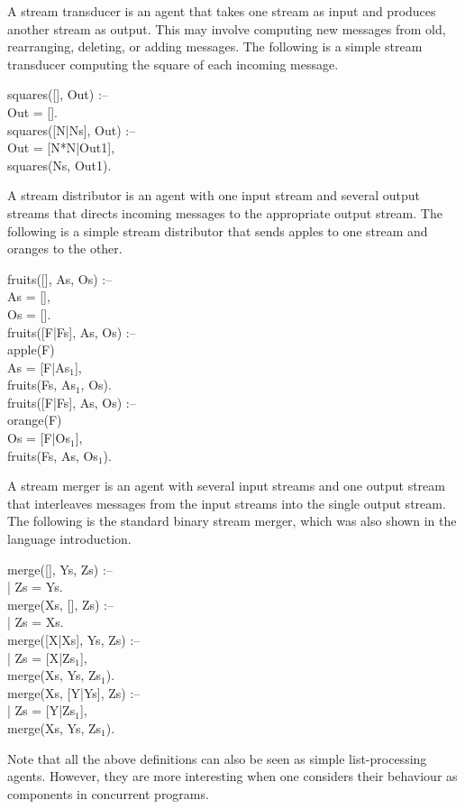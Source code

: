 A stream transducer is an agent that takes one stream as input and
produces another stream as output.  This may involve computing new
messages from old, rearranging, deleting, or adding messages.  The
following is a simple stream transducer computing the square of each
incoming message.
%
\begin{program}
squares([], Out) :-- \\
\>\cond\>Out = [].  \\
squares([N|Ns], Out) :-- \\
\>\cond\>Out = [N*N|Out1], \\
\>\>squares(Ns, Out1).
\end{program}%
%
A stream distributor is an agent with one input stream and several
output streams that directs incoming messages to the appropriate
output stream.  The following is a simple stream distributor that
sends apples to one stream and oranges to the other.
%
\begin{program}
fruits([], As, Os) :-- \\
\>\cond\>As = [], \\
\>\>Os = [].  \\
fruits([F|Fs], As, Os) :-- \\
\>\>	apple(F) \\
\>\cond\>As = [F|As$_1$], \\
\>\>	fruits(Fs, As$_1$, Os).  \\
fruits([F|Fs], As, Os) :-- \\
\>\>	orange(F) \\
\>\cond\>	Os = [F|Os$_1$], \\
\>\>	fruits(Fs, As, Os$_1$).
\end{program}%
%
A stream merger is an agent with several input streams and one output
stream that interleaves messages from the input streams into the
single output stream.  The following is the standard binary stream
merger, which was also shown in the language introduction.
%
\begin{program}
merge([], Ys, Zs) :-- \\
\>|\>	Zs = Ys.  \\
merge(Xs, [], Zs) :-- \\
\>|\>	Zs = Xs.  \\
merge([X|Xs], Ys, Zs) :-- \\
\>|\>	Zs = [X|Zs$_1$], \\
\>\>	merge(Xs, Ys, Zs$_1$).  \\
merge(Xs, [Y|Ys], Zs) :-- \\
\>|\>	Zs = [Y|Zs$_1$], \\
\>\>	merge(Xs, Ys, Zs$_1$).
\end{program}%
%
Note that all the above definitions can also be seen as simple
list-processing agents.  However, they are more interesting when one
considers their behaviour as components in concurrent programs.

